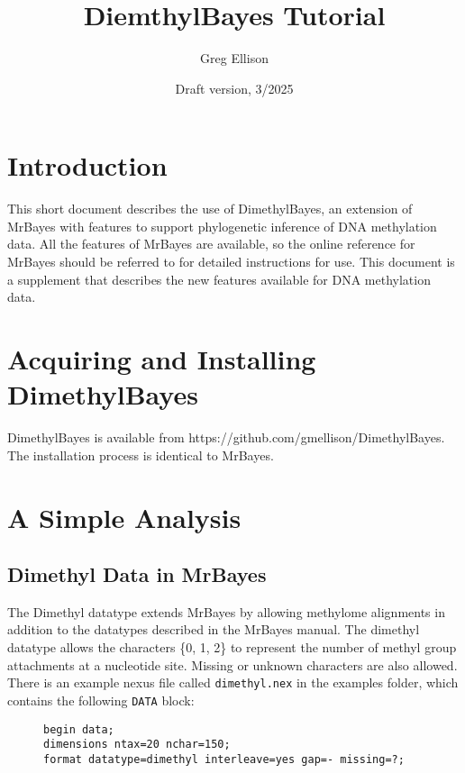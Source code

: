 \documentclass[12pt]{article}
\begin{document}
\title{DiemthylBayes Tutorial}

\date{\large Draft version, 3/2025}

\author{Greg Ellison}

\maketitle

\tableofcontents

\section{Introduction}\label{intro}

This short document describes the use of DimethylBayes, an extension of MrBayes
with features to support phylogenetic inference of DNA methylation data. All the 
features of MrBayes are available, so the online reference for MrBayes 
should be referred to for detailed instructions for use.
This document is a supplement that describes the 
new features available for DNA methylation data. 

\section{Acquiring and Installing DimethylBayes}

DimethylBayes is available from https://github.com/gmellison/DimethylBayes.
The installation process is identical to MrBayes. 

\section{A Simple Analysis}\label{tutorialSimple}

\subsection{Dimethyl Data in MrBayes}

The Dimethyl datatype extends MrBayes by allowing methylome alignments 
in addition to the datatypes described in the MrBayes manual. The 
dimethyl datatype allows the characters \{0, 1, 2\} to represent the 
number of methyl group attachments at a nucleotide site. Missing or 
unknown characters are also allowed. There is an example nexus file 
called \texttt{dimethyl.nex} in the examples folder, which contains the 
following \texttt{DATA} block:

\begin{figure}[h]
\centering
\begin{Verbatim}
begin data;
dimensions ntax=20 nchar=150;
format datatype=dimethyl interleave=yes gap=- missing=?;
\end{Verbatim}
\end{figure}
\end{document}
